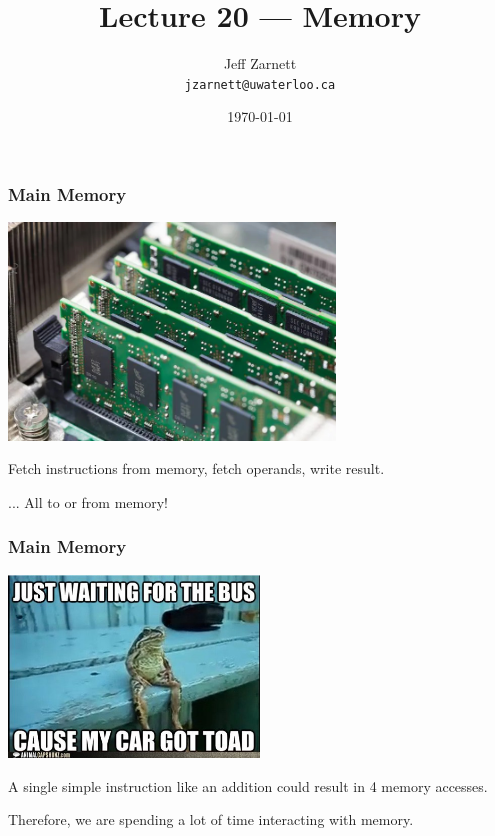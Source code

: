 

\title{Lecture 20 --- Memory }

\author{Jeff Zarnett \\ \small \texttt{jzarnett@uwaterloo.ca}}
\date{\today}




\begin{frame}
  \titlepage

 \end{frame}


\begin{frame}
\frametitle{Main Memory}

\begin{center}
	\includegraphics[width=0.65\textwidth]{images/ram.jpg}
\end{center}

Fetch instructions from memory, fetch operands, write result.

... All to or from memory!

 \end{frame}


\begin{frame}
\frametitle{Main Memory}

\begin{center}
	\includegraphics[width=0.5\textwidth]{images/waiting-for-the-bus.jpg}
\end{center}

A single simple instruction like an addition could result in 4 memory accesses. 

Therefore, we are spending a lot of time interacting with memory.


\end{frame}

